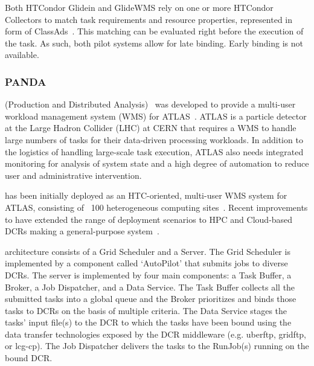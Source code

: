 \documentclass{sig-alternate}
\begin{document}
Both HTCondor Glidein and GlideWMS rely on one or more HTCondor Collectors to
match task requirements and resource properties, represented in form of
ClassAds~\cite{classad_url}. This matching can be evaluated right before the
execution of the task. As such, both pilot systems allow for late binding. Early
binding is not available.


%
\subsubsection{PANDA}
\label{sec:panda}



\panda (Production and Distributed Analysis)~\cite{1742-6596-331-7-072069} was
developed to provide a multi-user workload management system (WMS) for
ATLAS~\cite{aad2008atlas}. ATLAS is a particle detector at the Large Hadron
Collider (LHC) at CERN that requires a WMS to handle large numbers of tasks for
their data-driven processing workloads. In addition to the logistics of handling
large-scale task execution, ATLAS also needs integrated monitoring for analysis
of system state and a high degree of automation to reduce user and
administrative intervention.

\panda has been initially deployed as an HTC-oriented, multi-user WMS system for
ATLAS, consisting of ~100 heterogeneous computing sites~\cite{maeno_pd2p:_2012}.
Recent improvements to \panda have extended the range of deployment scenarios to
HPC and Cloud-based DCRs making \panda a general-purpose \pilot
system~\cite{nilsson2012recent}.

\panda architecture consists of a Grid Scheduler and a \panda Server. The Grid
Scheduler is implemented by a component called `AutoPilot' that submits jobs to
diverse DCRs. The \panda server is implemented by four main components: a Task
Buffer, a Broker, a Job Dispatcher, and a Data Service. The Task Buffer collects
all the submitted tasks into a global queue and the Broker prioritizes and binds
those tasks to DCRs on the basis of multiple criteria. The Data Service stages
the tasks' input file(s) to the DCR to which the tasks have been bound using the
data transfer technologies exposed by the DCR middleware (e.g. uberftp, gridftp,
or lcg-cp). The Job Dispatcher delivers the tasks to the RunJob(s) running on
the bound DCR.
\end{document}
